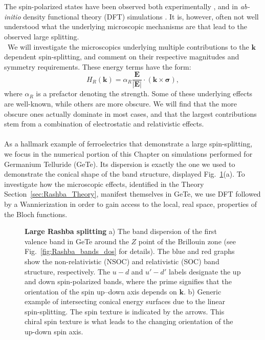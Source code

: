 \\\\
The spin-polarized states have been observed both experimentally \cite{Ishizaka2011,Liebmann2016,Krempasky2015}, and in {\it ab-initio} density functional theory (DFT) simulations \cite{DiSante2013, Kim2014, Picozzi2014}.
It is, however, often not well understood what the underlying microscopic mechanisms are that lead to the observed large splitting.
\\\
We will investigate the microscopics underlying multiple contributions to the $\bm{k}$ dependent spin-splitting, and comment on their respective magnitudes and symmetry requirements. 
These energy terms have the form:
\begin{equation}
	\label{eq:Rashba_form}
	H_R(\bm{k}) = \alpha_R \frac{\bm{E}}{|\bm{E}|} \cdot (\bm{k} \times \bm \sigma),
\end{equation}
where $\alpha_R$ is a prefactor denoting the strength.
Some of these underlying effects are well-known, while others are more obscure.
We will find that the more obscure ones actually dominate in most cases, and that the largest contributions stem from a combination of electrostatic and relativistic effects.
\\\\
As a hallmark example of ferroelectrics that demonstrate a large spin-splitting, we focus in the numerical portion of this Chapter on simulations performed for Germanium Telluride (GeTe).
Its dispersion is exactly the one we used to demonstrate the conical shape of the band structure, displayed Fig.~\ref{fig:Rashba_intro_dispersion}(a).
To investigate how the microscopic effects, identified in the Theory Section~\ref{sec:Rashba_Theory}, manifest themselves in GeTe, we use DFT followed by a Wannierization in order to gain access to the local, real space, properties of the Bloch functions.
\begin{figure}[h]
	\caption{\label{fig:Rashba_intro_dispersion}
		{\bf Large Rashba splitting} a) The band dispersion of the first valence band in GeTe around the $Z$ point of the Brillouin zone (see Fig.~\ref{fig:Rashba_bands_dos} for details). The blue and red graphs show the non-relativistic (NSOC) and relativistic (SOC) band structure, respectively. The $u-d$ and $u'-d'$ labels designate the up and down spin-polarized bands, where the prime signifies that the orientation of the spin up--down axis depends on $\bm{k}$. b) Generic example of intersecting conical energy surfaces due to the linear spin-splitting. The spin texture is indicated by the arrows. This chiral spin texture is what leads to the changing orientation of the up-down spin axis.}
\end{figure}

